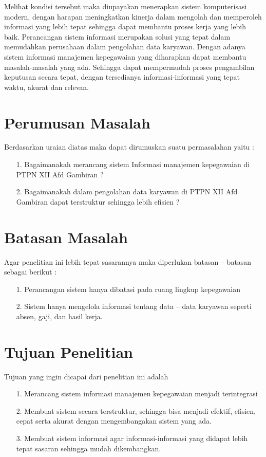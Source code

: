 \documentclass{jtetiproposalskripsi}
\begin{document}
Melihat kondisi tersebut maka diupayakan menerapkan sistem komputerisasi modern, dengan harapan meningkatkan kinerja dalam mengolah dan memperoleh informasi yang lebih tepat sehingga dapat membantu proses kerja yang lebih baik. Perancangan sistem informasi merupakan solusi yang tepat dalam memudahkan perusahaan dalam pengolahan data karyawan. Dengan adanya sistem informasi manajemen kepegawaian yang diharapkan dapat membantu masalah-masalah yang ada. Sehingga dapat mempermudah proses pengambilan keputusan secara tepat, dengan tersedianya informasi-informasi yang tepat waktu, akurat dan relevan.

\section{Perumusan Masalah}
Berdasarkan uraian diatas maka dapat dirumuskan suatu permasalahan yaitu :  
\begin{itemize}
\item[1.] Bagaimanakah merancang sistem Informasi manajemen kepegawaian di PTPN XII Afd Gambiran ?
\item[2.] Bagaimanakah dalam pengolahan data karyawan di PTPN XII Afd Gambiran  dapat terstruktur sehingga lebih efisien ?
\end{itemize}

\section{Batasan Masalah}

Agar penelitian ini lebih tepat sasarannya maka diperlukan batasan – batasan sebagai berikut : 
\begin{itemize}
\item[1.] Perancangan sistem hanya dibatasi pada ruang lingkup kepegawaian
\item[2.] Sistem hanya mengelola informasi tentang data – data karyawan seperti absen, gaji, dan hasil kerja.
\end{itemize}

\section{Tujuan Penelitian}
Tujuan yang ingin dicapai dari penelitian ini adalah
\begin{itemize}
\item[1.] Merancang sistem informasi manajemen kepegawaian menjadi terintegrasi
\item[2.] Membuat sistem secara terstruktur, sehingga bisa menjadi efektif, efisien, cepat serta akurat dengan mengembangakan sistem yang ada.
\item[3.] Membuat sistem informasi agar informasi-informasi yang didapat lebih tepat sasaran sehingga mudah dikembangkan.
\end{itemize}
\end{document}
